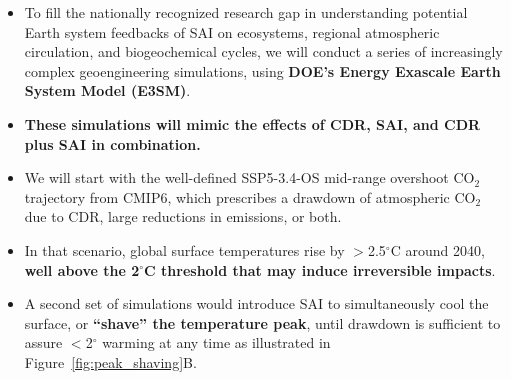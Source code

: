 \begin{itemize}
	\item To fill the nationally recognized research gap in understanding potential Earth system feedbacks of SAI on ecosystems, regional atmospheric circulation, and biogeochemical cycles, we will conduct a series of increasingly complex geoengineering simulations, using \textbf{DOE's Energy Exascale Earth System Model (E3SM)}.

	\item \textbf{These simulations will mimic the effects of CDR, SAI, and CDR plus SAI in combination.}

	\item We will start with the well-defined SSP5-3.4-OS mid-range overshoot CO$_2$ trajectory from CMIP6, which prescribes a drawdown of atmospheric CO$_2$ due to CDR, large reductions in emissions, or both.

	\item In that scenario, global surface temperatures rise by $>$2.5$^\circ$C around 2040, \textbf{well above the 2$^\circ$C threshold that may induce irreversible impacts}.

	\item A second set of simulations would introduce SAI to simultaneously cool the surface, or \textbf{``shave'' the temperature peak}, until drawdown is sufficient to assure $<$2$^\circ$ warming at any time as illustrated in Figure~\ref{fig:peak_shaving}B.
\end{itemize}

\vskip0.25in


